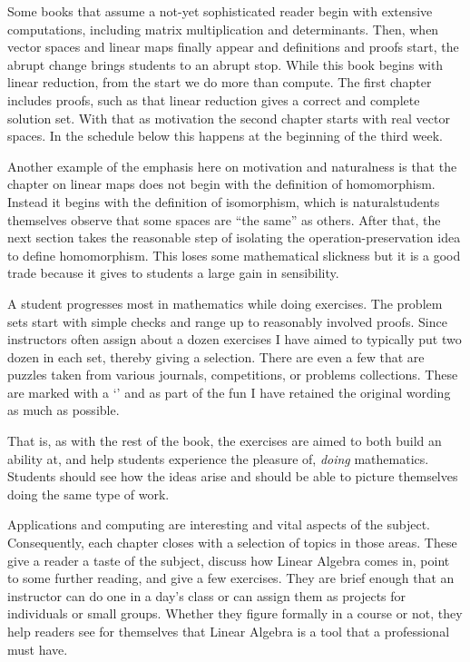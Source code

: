 {Some books that assume a not-yet sophisticated reader
begin with extensive computations, including 
matrix multiplication
and determinants.
Then, when 
vector spaces and linear maps finally appear
and definitions and proofs start, the abrupt change
brings students to an abrupt stop.
While this book begins with
linear reduction, from the start
we do more than compute.
The first chapter
includes proofs, such as that linear reduction gives a correct and
complete solution set.
With that as motivation
the second chapter starts with real vector spaces.
In the schedule below this happens at the beginning of the third week.

Another example of the emphasis here on motivation and naturalness
is that the chapter on linear maps
does not begin with the definition of homomorphism.
Instead it begins with the definition of isomorphism, which
is natural\Dash students themselves
observe that some spaces are ``the same'' as others.
After that,
the next section takes the reasonable step of 
isolating the operation-preservation idea
to define homomorphism.
This loses some mathematical slickness 
but it is a good trade because it gives to students
a large gain in sensibility.

A student progresses most in mathematics while doing exercises. 
The problem sets start with 
simple checks and range up to reasonably involved proofs.
Since instructors often assign about a dozen exercises
I have aimed to typically put two dozen in each set, 
thereby giving a selection.
There are even a few that are puzzles
taken from various journals, competitions, or
problems collections. 
These are marked with a
`\puzzlemark' and 
as part of the fun I have retained the original wording
as much as possible.

That is, as with the rest of the book, 
the exercises are aimed to both build an ability at,
and help students experience the pleasure of, 
\emph{doing} mathematics.
Students should see how the ideas arise and should be able to 
picture themselves doing the same type of work.


\medskip
{}
Applications and computing are interesting and vital aspects 
of the subject.
Consequently, each chapter closes with a selection of
topics in those areas.
These give a reader
a taste of the subject, discuss how Linear Algebra comes in,
point to some further reading, and give a few exercises. 
They are brief enough that an instructor can do one
in a day's class 
or can assign them as projects for individuals or small groups.
Whether they figure formally in a course or not, they help
readers see for themselves that Linear Algebra is a tool
that a professional must have. 




}
